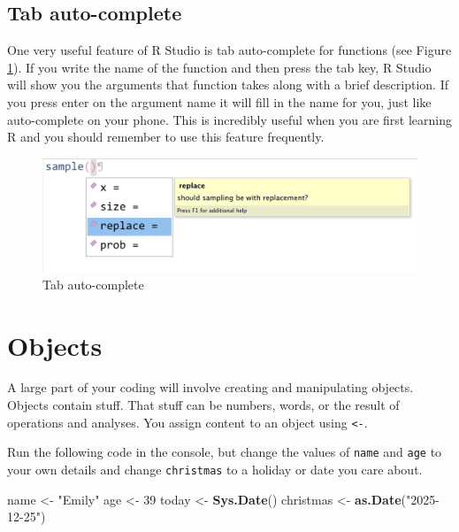\documentclass[
  oneside]{book}
\newenvironment{Shaded}{\begin{snugshade}}{\end{snugshade}}
\newcommand{\DecValTok}[1]{\textcolor[rgb]{0.00,0.00,0.81}{#1}}
\newcommand{\FunctionTok}[1]{\textcolor[rgb]{0.13,0.29,0.53}{\textbf{#1}}}
\newcommand{\NormalTok}[1]{#1}
\newcommand{\OtherTok}[1]{\textcolor[rgb]{0.56,0.35,0.01}{#1}}
\newcommand{\StringTok}[1]{\textcolor[rgb]{0.31,0.60,0.02}{#1}}
\begin{document}
\subsection{Tab auto-complete}\label{tab-auto-complete}

One very useful feature of R Studio is tab auto-complete for functions (see Figure \ref{fig:img-autocomplete}). If you write the name of the function and then press the tab key, R Studio will show you the arguments that function takes along with a brief description. If you press enter on the argument name it will fill in the name for you, just like auto-complete on your phone. This is incredibly useful when you are first learning R and you should remember to use this feature frequently.

\begin{figure}

{\centering \includegraphics[width=1\linewidth]{images/intro/autocomplete} 

}

\caption{Tab auto-complete}\label{fig:img-autocomplete}
\end{figure}

\section{Objects}\label{objects}

A large part of your coding will involve creating and manipulating objects. Objects contain stuff. That stuff can be numbers, words, or the result of operations and analyses. You assign content to an object using \texttt{\textless{}-}.

Run the following code in the console, but change the values of \texttt{name} and \texttt{age} to your own details and change \texttt{christmas} to a holiday or date you care about.

\begin{Shaded}
\begin{Highlighting}[]
\NormalTok{name }\OtherTok{\textless{}{-}} \StringTok{"Emily"}
\NormalTok{age }\OtherTok{\textless{}{-}} \DecValTok{39}
\NormalTok{today }\OtherTok{\textless{}{-}} \FunctionTok{Sys.Date}\NormalTok{()}
\NormalTok{christmas }\OtherTok{\textless{}{-}} \FunctionTok{as.Date}\NormalTok{(}\StringTok{"2025{-}12{-}25"}\NormalTok{)}
\end{Highlighting}
\end{Shaded}
\end{document}
